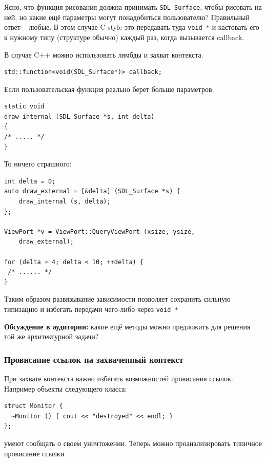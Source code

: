 \documentclass[a4paper,12pt,oneside]{article}
\begin{document}
Ясно, что функция рисования должна принимать \lstinline!SDL_Surface!, чтобы рисовать на ней, но какие ещё параметры могут понадобиться пользователю? Правильный ответ -- любые. В этом случае C-style это передавать туда \lstinline!void *! и кастовать его к нужному типу (структуре обычно) каждый раз, когда вызывается callback.

В случае C++ можно использовать лямбды и захват контекста.

\begin{lstlisting}
std::function<void(SDL_Surface*)> callback;
\end{lstlisting}

Если пользовательская функция реально берет больше параметров:

\begin{lstlisting}
static void
draw_internal (SDL_Surface *s, int delta)
{
/* ..... */
}
\end{lstlisting}

То ничего страшного:

\begin{lstlisting}
int delta = 0;
auto draw_external = [&delta] (SDL_Surface *s) { 
    draw_internal (s, delta); 
};

ViewPort *v = ViewPort::QueryViewPort (xsize, ysize, 
    draw_external);

for (delta = 4; delta < 10; ++delta) {
 /* ...... */
}
\end{lstlisting}

Таким образом развязывание зависимости позволяет сохранить сильную типизацию и избегать передачи чего-либо через \lstinline!void *!

\textbf{Обсуждение в аудитории:} какие ещё методы можно предложить для решения той же архитектурной задачи?

\subsubsection{Провисание ссылок на захваченный контекст}\label{DanglingContext}

При захвате контекста важно избегать возможностей провисания ссылок. Например объекты следующего класса:

\begin{lstlisting}
struct Monitor {
  ~Monitor () { cout << "destroyed" << endl; }
};
\end{lstlisting}

умеют сообщать о своем уничтожении. Теперь можно проанализировать типичное провисание ссылки
\end{document}
